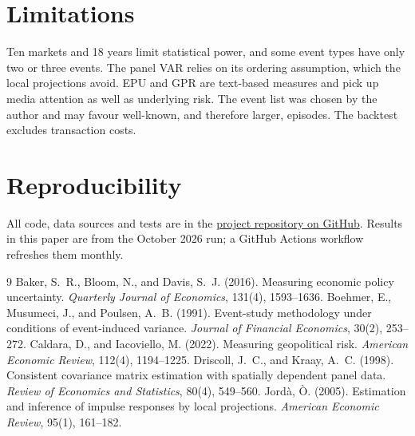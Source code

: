 \documentclass[11pt]{article}
\begin{document}
\section{Limitations}
Ten markets and 18 years limit statistical power, and some event types have only two or three events. The panel VAR relies on its ordering assumption, which the local projections avoid. EPU and GPR are text-based measures and pick up media attention as well as underlying risk. The event list was chosen by the author and may favour well-known, and therefore larger, episodes. The backtest excludes transaction costs.

\section*{Reproducibility}
All code, data sources and tests are in the \href{https://github.com/divvygupta/The-Impact-of-Political-Risk-on-Financial-Markets-A-Panel-VAR-and-Event-Study-Analysis}{project repository on GitHub}. Results in this paper are from the October 2026 run; a GitHub Actions workflow refreshes them monthly.

\begin{thebibliography}{9}
 Baker, S.~R., Bloom, N., and Davis, S.~J. (2016). Measuring economic policy uncertainty. \emph{Quarterly Journal of Economics}, 131(4), 1593--1636.
 Boehmer, E., Musumeci, J., and Poulsen, A.~B. (1991). Event-study methodology under conditions of event-induced variance. \emph{Journal of Financial Economics}, 30(2), 253--272.
 Caldara, D., and Iacoviello, M. (2022). Measuring geopolitical risk. \emph{American Economic Review}, 112(4), 1194--1225.
 Driscoll, J.~C., and Kraay, A.~C. (1998). Consistent covariance matrix estimation with spatially dependent panel data. \emph{Review of Economics and Statistics}, 80(4), 549--560.
 Jord\`a, \`O. (2005). Estimation and inference of impulse responses by local projections. \emph{American Economic Review}, 95(1), 161--182.
\end{thebibliography}
\end{document}
